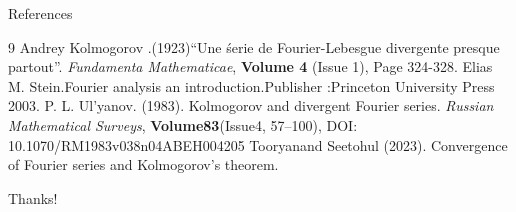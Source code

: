 \documentclass{beamer}
\begin{document}
\begin{frame}{References}
    \begin{thebibliography}{9}
        Andrey Kolmogorov .(1923)“Une śerie de Fourier-Lebesgue divergente presque partout”. \textit{Fundamenta Mathematicae}, \textbf{Volume 4 }(Issue 1), Page 324-328.
        Elias M. Stein.Fourier analysis an introduction.Publisher :Princeton University Press 2003.
        P. L. Ul’yanov. (1983). Kolmogorov and divergent Fourier series. \textit{Russian Mathematical Surveys}, \textbf{Volume83}(Issue4, 57–100), DOI: 10.1070/RM1983v038n04ABEH004205
        Tooryanand Seetohul (2023). Convergence of Fourier series and Kolmogorov’s theorem. 
        
        \end{thebibliography}
\end{frame}

\begin{frame}
    \begin{center}
        {\Huge\calligra Thanks!}
    \end{center}
\end{frame}
\end{document}
